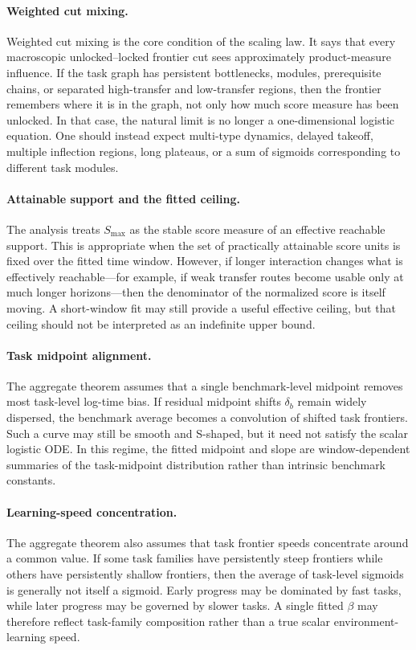 \paragraph{Weighted cut mixing.}
Weighted cut mixing is the core condition of the scaling law. It says that every macroscopic unlocked--locked frontier cut sees approximately product-measure influence. If the task graph has persistent bottlenecks, modules, prerequisite chains, or separated high-transfer and low-transfer regions, then the frontier remembers where it is in the graph, not only how much score measure has been unlocked. In that case, the natural limit is no longer a one-dimensional logistic equation. One should instead expect multi-type dynamics, delayed takeoff, multiple inflection regions, long plateaus, or a sum of sigmoids corresponding to different task modules.

\paragraph{Attainable support and the fitted ceiling.}
The analysis treats \(S_{\max}\) as the stable score measure of an effective reachable support. This is appropriate when the set of practically attainable score units is fixed over the fitted time window. However, if longer interaction changes what is effectively reachable---for example, if weak transfer routes become usable only at much longer horizons---then the denominator of the normalized score is itself moving. A short-window fit may still provide a useful effective ceiling, but that ceiling should not be interpreted as an indefinite upper bound.

\paragraph{Task midpoint alignment.}
The aggregate theorem assumes that a single benchmark-level midpoint removes most task-level log-time bias. If residual midpoint shifts \(\delta_b\) remain widely dispersed, the benchmark average becomes a convolution of shifted task frontiers. Such a curve may still be smooth and S-shaped, but it need not satisfy the scalar logistic ODE. In this regime, the fitted midpoint and slope are window-dependent summaries of the task-midpoint distribution rather than intrinsic benchmark constants.

\paragraph{Learning-speed concentration.}
The aggregate theorem also assumes that task frontier speeds concentrate around a common value. If some task families have persistently steep frontiers while others have persistently shallow frontiers, then the average of task-level sigmoids is generally not itself a sigmoid. Early progress may be dominated by fast tasks, while later progress may be governed by slower tasks. A single fitted \(\beta\) may therefore reflect task-family composition rather than a true scalar environment-learning speed.

